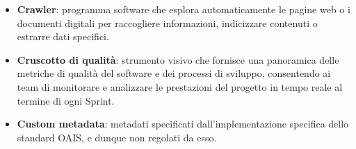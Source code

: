 \documentclass[a4paper,12pt]{article}
\begin{document}
\begin{itemize}
    \item \textbf{Crawler}: programma software che esplora automaticamente le pagine web o i documenti digitali per raccogliere informazioni, indicizzare contenuti o estrarre dati specifici. 
    \item \textbf{Cruscotto di qualità}: strumento visivo che fornisce una panoramica delle metriche di qualità del software e dei processi di sviluppo, consentendo ai team di monitorare e analizzare le prestazioni del progetto in tempo reale al termine di ogni Sprint.
    \item \textbf{Custom metadata}: metadati specificati dall'implementazione specifica dello standard OAIS, e dunque non regolati da esso.
\end{itemize}
\end{document}
